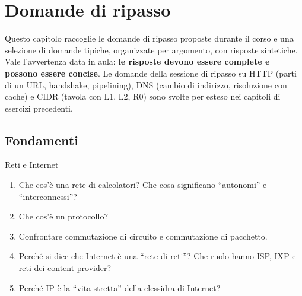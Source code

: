 \chapter{Domande di ripasso}

Questo capitolo raccoglie le domande di ripasso proposte durante il corso e una selezione di domande tipiche, organizzate per
argomento, con risposte sintetiche. Vale l'avvertenza data in aula: \textbf{le risposte devono essere complete e possono essere
concise}. Le domande della sessione di ripasso su HTTP (parti di un URL, handshake, pipelining), DNS (cambio di indirizzo,
risoluzione con cache) e CIDR (tavola con L1, L2, R0) sono svolte per esteso nei capitoli di esercizi precedenti.


\section{Fondamenti}

\begin{esercizio}{Reti e Internet}
\begin{enumerate}[label=(\alph*)]
    \item Che cos'è una rete di calcolatori? Che cosa significano ``autonomi'' e ``interconnessi''?
    \item Che cos'è un protocollo?
    \item Confrontare commutazione di circuito e commutazione di pacchetto.
    \item Perché si dice che Internet è una ``rete di reti''? Che ruolo hanno ISP, IXP e reti dei content provider?
    \item Perché IP è la ``vita stretta'' della clessidra di Internet?
\end{enumerate}
\end{esercizio}


